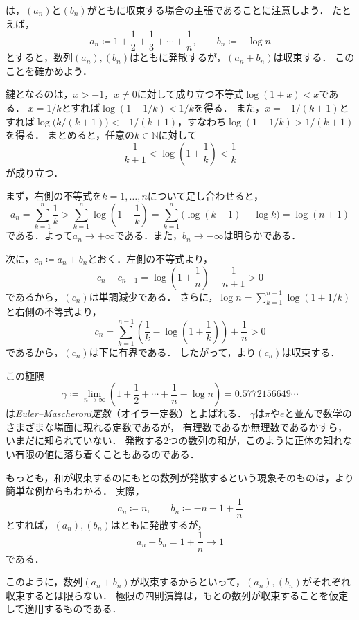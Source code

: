 \begin{remark}[四則演算は収束列に限る]
  は，$(a_n)$と$(b_n)$がともに収束する場合の主張であることに注意しよう．
  たとえば，
  \[
    a_n \coloneqq 1+\frac12+\frac13+\cdots+\frac1n,
    \qquad
    b_n \coloneqq -\log n
  \]
  とすると，数列$(a_n),(b_n)$はともに発散するが，$(a_n+b_n)$は収束する．
  このことを確かめよう．

  鍵となるのは，$x>-1$，$x\ne 0$に対して成り立つ不等式$\log(1+x)<x$である．
  $x=1/k$とすれば$\log(1+1/k)<1/k$を得る．
  また，$x=-1/(k+1)$とすれば$\log\bigl(k/(k+1)\bigr)<-1/(k+1)$，すなわち$\log(1+1/k)>1/(k+1)$を得る．
  まとめると，任意の$k\in\mathbb{N}$に対して
  \[
    \frac{1}{k+1}<\log\left(1+\frac1k\right)<\frac1k
  \]
  が成り立つ．

  まず，右側の不等式を$k=1,\dots,n$について足し合わせると，
  \[
    a_n
    =\sum_{k=1}^{n}\frac1k
    >\sum_{k=1}^{n}\log\left(1+\frac1k\right)
    =\sum_{k=1}^{n}\bigl(\log(k+1)-\log k\bigr)
    =\log(n+1)
  \]
  である．よって$a_n\to+\infty$である．また，$b_n\to-\infty$は明らかである．

  次に，$c_n\coloneqq a_n+b_n$とおく．左側の不等式より，
  \[
    c_n-c_{n+1}
    =\log\left(1+\frac1n\right)-\frac{1}{n+1}
    >0
  \]
  であるから，$(c_n)$は単調減少である．
  さらに，$\log n=\sum_{k=1}^{n-1}\log(1+1/k)$と右側の不等式より，
  \[
    c_n
    =\sum_{k=1}^{n-1}\left(\frac1k-\log\left(1+\frac1k\right)\right)+\frac1n
    >0
  \]
  であるから，$(c_n)$は下に有界である．
  したがって，より$(c_n)$は収束する．

  この極限
  \[
    \gamma
    \coloneqq\lim_{n\to\infty}\left(1+\frac12+\cdots+\frac1n-\log n\right)
    =0.5772156649\cdots
  \]
  は\emph{Euler--Mascheroni定数}（オイラー定数）とよばれる．
  $\gamma$は$\pi$や$e$と並んで数学のさまざまな場面に現れる定数であるが，
  有理数であるか無理数であるかすら，いまだに知られていない．
  発散する2つの数列の和が，このように正体の知れない有限の値に落ち着くこともあるのである．

  もっとも，和が収束するのにもとの数列が発散するという現象そのものは，より簡単な例からもわかる．
  実際，
  \[
    a_n\coloneqq n,
    \qquad
    b_n\coloneqq -n+1+\frac1n
  \]
  とすれば，$(a_n),(b_n)$はともに発散するが，
  \[
    a_n+b_n=1+\frac1n\to 1
  \]
  である．

  このように，数列$(a_n+b_n)$が収束するからといって，$(a_n),(b_n)$がそれぞれ収束するとは限らない．
  極限の四則演算は，もとの数列が収束することを仮定して適用するものである．
\end{remark}

